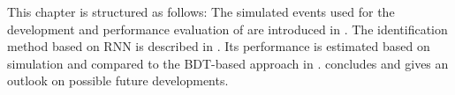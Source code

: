 This chapter is structured as follows: The simulated events used for the
development and performance evaluation of \tauid are introduced in
. The identification method based on RNN is described in
. Its performance is estimated based on simulation and
compared to the BDT-based approach in .
 concludes and gives an outlook on possible future
developments.

